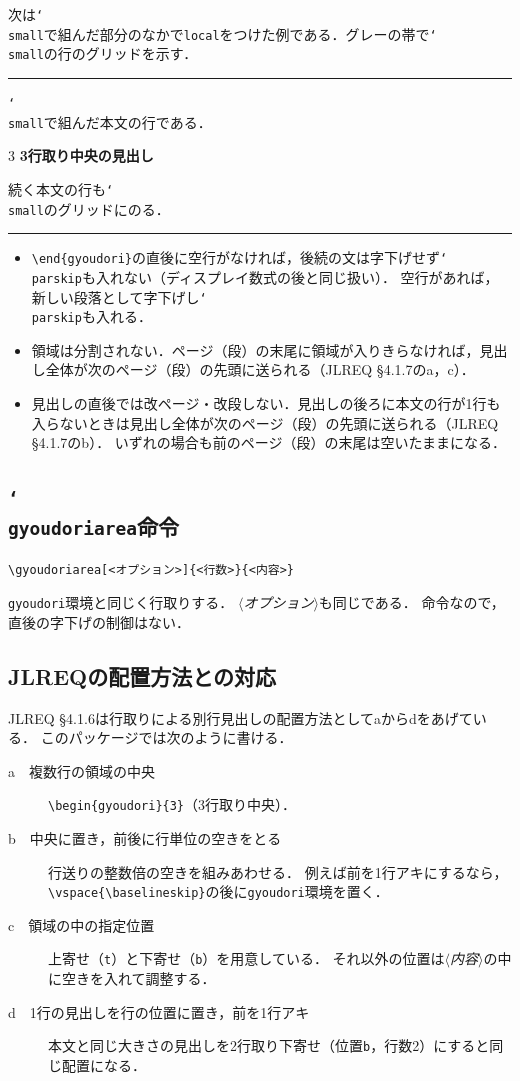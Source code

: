 \documentclass[paper=a4,dvipdfmx]{jlreq}
\newcommand\opt[1]{\texttt{#1}}
\newcommand\env[1]{\texttt{#1}}
\newcommand\cs[1]{\texttt{\char`\\#1}}
\newcommand\meta[1]{$\langle$\textit{#1}$\rangle$}
\newenvironment{demo}
  {\par\medskip\noindent
   \begin{minipage}{\linewidth}\hrule\smallskip}
  {\par\smallskip\hrule\end{minipage}\par\medskip}
\begin{document}
次は\cs{small}で組んだ部分のなかで\opt{local}をつけた例である．グレーの帯で\cs{small}の行のグリッドを示す．

\begin{demo}
\small{}\cs{small}で組んだ本文の行である．
\begin{gyoudori}[local]{3}
\normalsize\bfseries 3行取り中央の見出し
\end{gyoudori}
続く本文の行も\cs{small}のグリッドにのる．
\end{demo}

\begin{itemize}
\item \verb|\end{gyoudori}|の直後に空行がなければ，後続の文は字下げせず\cs{parskip}も入れない（ディスプレイ数式の後と同じ扱い）．
 空行があれば，新しい段落として字下げし\cs{parskip}も入れる．
\item 領域は分割されない．ページ（段）の末尾に領域が入りきらなければ，見出し全体が次のページ（段）の先頭に送られる（JLREQ \S4.1.7のa，c）．
\item 見出しの直後では改ページ・改段しない．見出しの後ろに本文の行が1行も入らないときは見出し全体が次のページ（段）の先頭に送られる（JLREQ \S4.1.7のb）．
  いずれの場合も前のページ（段）の末尾は空いたままになる．
\end{itemize}

\subsection{\cs{gyoudoriarea}命令}

\begin{verbatim}
\gyoudoriarea[<オプション>]{<行数>}{<内容>}
\end{verbatim}
\env{gyoudori}環境と同じく行取りする．
\meta{オプション}も同じである．
命令なので，直後の字下げの制御はない．

\subsection{JLREQの配置方法との対応}
\label{sec:pos}

JLREQ \S4.1.6は行取りによる別行見出しの配置方法としてaからdをあげている．
このパッケージでは次のように書ける．
\begin{description}
\item[a　複数行の領域の中央] \verb|\begin{gyoudori}{3}|（3行取り中央）．
\item[b　中央に置き，前後に行単位の空きをとる] 行送りの整数倍の空きを組みあわせる．
  例えば前を1行アキにするなら，\verb|\vspace{\baselineskip}|の後に\env{gyoudori}環境を置く．
\item[c　領域の中の指定位置] 上寄せ（\opt{t}）と下寄せ（\opt{b}）を用意している．
  それ以外の位置は\meta{内容}の中に空きを入れて調整する．
\item[d　1行の見出しを行の位置に置き，前を1行アキ] 本文と同じ大きさの見出しを2行取り下寄せ（位置\opt{b}，行数2）にすると同じ配置になる．
\end{description}
\end{document}
